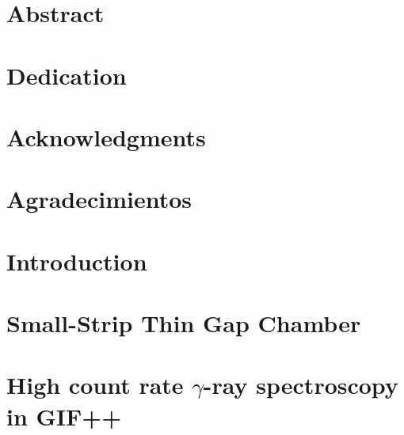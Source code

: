 








\chapter*{Abstract}



\chapter*{Dedication}


\chapter*{Acknowledgments}
\chapter*{Agradecimientos}


\tableofcontents


\chapter{Introduction}



\chapter{Small-Strip Thin Gap Chamber}
\linenumbers



\chapter{High count rate $\gamma$-ray spectroscopy in GIF++}


